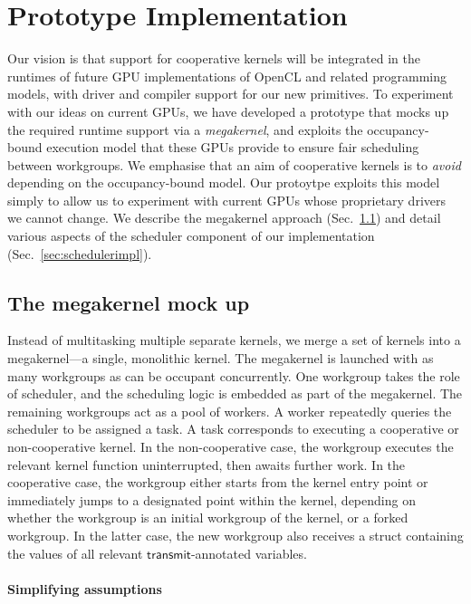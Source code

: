 \documentclass[numbers,nocopyrightspace,10pt]{sigplanconf}
\newcommand{\mysec}{Sec.~}
\newcommand{\transmit}{\mathsf{transmit}}
\begin{document}
\section{Prototype Implementation}\label{sec:implementation}

Our vision is that support for cooperative kernels will be integrated
in the runtimes of future GPU implementations of OpenCL and related
programming models, with driver and compiler support for our new
primitives.  To experiment with our ideas on current GPUs, we have
developed a prototype that mocks up the required runtime support via a
\emph{megakernel}, and exploits the occupancy-bound execution model
that these GPUs provide to ensure fair scheduling between workgroups.
We emphasise that an aim of cooperative kernels is to \emph{avoid}
depending on the occupancy-bound model.  Our protoytpe exploits this
model simply to allow us to experiment with current GPUs whose
proprietary drivers we cannot change.  We describe the megakernel approach (\mysec\ref{sec:megakernel})
and detail various aspects of the scheduler component of our implementation (\mysec\ref{sec:schedulerimpl}).

\subsection{The megakernel mock up}\label{sec:megakernel}

Instead of multitasking multiple separate kernels, we merge a set of
kernels into a megakernel---a single, monolithic kernel.  The
megakernel is launched with as many workgroups as can be occupant
concurrently.  One workgroup takes the role of scheduler, and the
scheduling logic is embedded as part of the megakernel.  The remaining
workgroups act as a pool of workers.  A worker repeatedly queries the
scheduler to be assigned a task.  A task corresponds to executing a
cooperative or non-cooperative kernel.  In the non-cooperative case,
the workgroup executes the relevant kernel function uninterrupted,
then awaits further work.  In the cooperative case, the workgroup
either starts from the kernel entry point or immediately jumps to a
designated point within the kernel, depending on whether the workgroup
is an initial workgroup of the kernel, or a forked workgroup.  In the
latter case, the new workgroup also receives a struct containing the
values of all relevant $\transmit$-annotated variables.

\paragraph{Simplifying assumptions}
\end{document}
